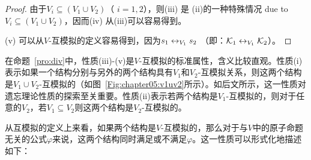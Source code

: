 \begin{proof}
	由于$V_i \subseteq (V_1 \cup V_2)$（ $i = 1, 2$），则(iii) 是 (ii)的一种特殊情况 due to $V_i \subseteq (V_1 \cup V_2)$，因而(iv) 从(iii)可以容易得到。
	
	(v) 可以从$V$-互模拟的定义容易得到，因为$s_1 \leftrightarrow_{V_1} s_2$ （即：${\cal K}_1\leftrightarrow_{V_1}{\cal K}_2$）。	
\end{proof}

 
 在命题~\ref{pro:div}中，性质(iii)-(v)是$V$-互模拟的标准属性，含义比较直观。性质(i)表示如果一个结构分别与另外的两个结构具有$V_1$和$V_2$-互模拟关系，则这两个结构是$V_1\cup V_2$-互模拟的（如图~\ref{Fig:chapter05:v1uv2}所示）。如后文所示，这一性质对遗忘理论性质的探索至关重要。性质(ii)表示若两个结构是$V_1$-互模拟的，则对于任意的$V_2$，若$V_1 \subseteq V_2$则这两个结构是$V_2$-互模拟的。
 
 从互模拟的定义上来看，如果两个结构是$V$-互模拟的，那么对于与$V$中的原子命题无关的公式$\varphi$来说，这两个结构同时满足或不满足$\varphi$。这一性质可以形式化地描述如下：
 

